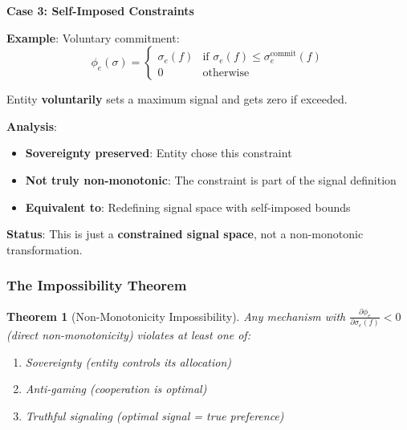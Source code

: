\documentclass[11pt,a4paper]{article}
\newtheorem{theorem}{Theorem}[section]
\theoremstyle{definition}
\theoremstyle{remark}
\begin{document}
\medskip

\textbf{Case 3: Self-Imposed Constraints}

\textbf{Example}: Voluntary commitment:
\[ \phi_e(\sigma) = \begin{cases}
\sigma_e(f) & \text{if } \sigma_e(f) \le \sigma_e^{\text{commit}}(f) \\
0 & \text{otherwise}
\end{cases} \]

Entity \textbf{voluntarily} sets a maximum signal and gets zero if exceeded.

\textbf{Analysis}:
\begin{itemize}
\item \textbf{Sovereignty preserved}: Entity chose this constraint
\item \textbf{Not truly non-monotonic}: The constraint is part of the signal definition
\item \textbf{Equivalent to}: Redefining signal space with self-imposed bounds
\end{itemize}

\textbf{Status}: This is just a \textbf{constrained signal space}, not a non-monotonic transformation.

\subsubsection{The Impossibility Theorem}

\begin{theorem}[Non-Monotonicity Impossibility]
Any mechanism with $\frac{\partial \phi_e}{\partial \sigma_e(f)} < 0$ (direct non-monotonicity) violates at least one of:
\begin{enumerate}
\item Sovereignty (entity controls its allocation)
\item Anti-gaming (cooperation is optimal)
\item Truthful signaling (optimal signal = true preference)
\end{enumerate}
\end{theorem}
\end{document}
